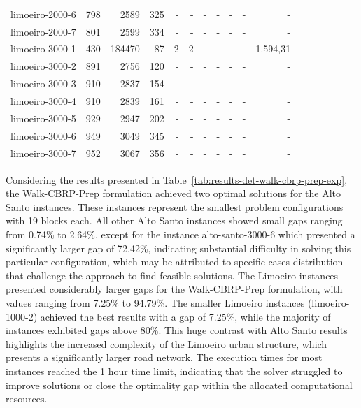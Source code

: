 \begin{table}[ht!]
{\begin{tabular}{lrrrrrrrrrr}
			limoeiro-2000-6                                                                        & 798 & 2589   & 325 & -  & -   & -   & -     & -   & - & -        \\
			limoeiro-2000-7                                                                        & 801 & 2599   & 334 & -  & -   & -   & -     & -   & - & -        \\
			\rowcolor{rowlight}limoeiro-3000-1                                                     & 430 & 184470 & 87  & 2  & 2   & -   & -     & -   & - & 1.594,31 \\
			limoeiro-3000-2                                                                        & 891 & 2756   & 120 & -  & -   & -   & -     & -   & - & -        \\
			limoeiro-3000-3                                                                        & 910 & 2837   & 154 & -  & -   & -   & -     & -   & - & -        \\
			limoeiro-3000-4                                                                        & 910 & 2839   & 161 & -  & -   & -   & -     & -   & - & -        \\
			limoeiro-3000-5                                                                        & 929 & 2947   & 202 & -  & -   & -   & -     & -   & - & -        \\
			limoeiro-3000-6                                                                        & 949 & 3049   & 345 & -  & -   & -   & -     & -   & - & -        \\
			limoeiro-3000-7                                                                        & 952 & 3067   & 356 & -  & -   & -   & -     & -   & - & -        \\
			\bottomrule
		\end{tabular}%
	}
\end{table}

Considering the results presented in Table~\ref{tab:results-det-walk-cbrp-prep-exp}, the Walk-CBRP-Prep formulation achieved two optimal solutions for the Alto Santo instances. These instances represent the smallest problem configurations with 19 blocks each. All other Alto Santo instances showed small gaps ranging from 0.74\% to 2.64\%, except for the instance alto-santo-3000-6 which presented a significantly larger gap of 72.42\%, indicating substantial difficulty in solving this particular configuration, which may be attributed to specific cases distribution that challenge the approach to find feasible solutions. The Limoeiro instances presented considerably larger gaps for the Walk-CBRP-Prep formulation, with values ranging from 7.25\% to 94.79\%. The smaller Limoeiro instances (limoeiro-1000-2) achieved the best results with a gap of 7.25\%, while the majority of instances exhibited gaps above 80\%. This huge contrast with Alto Santo results highlights the increased complexity of the Limoeiro urban structure, which presents a significantly larger road network. The execution times for most instances reached the 1 hour time limit, indicating that the solver struggled to improve solutions or close the optimality gap within the allocated computational resources.

